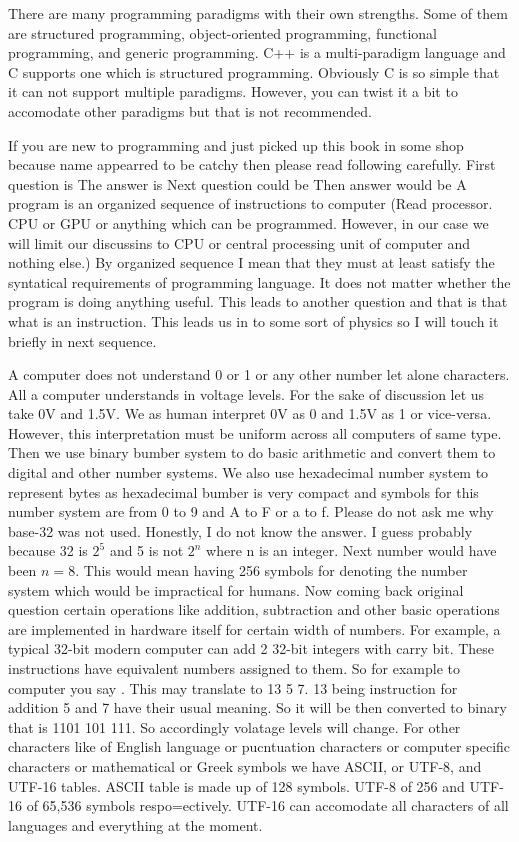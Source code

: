 There are many programming paradigms with their own strengths. Some of them are
structured programming, object-oriented programming, functional programming,
and generic programming. C++ is a multi-paradigm language and C supports one
which is structured programming. Obviously C is so simple that it can not
support multiple paradigms. However, you can twist it a bit to accomodate other
paradigms but that is not recommended.

If you are new to programming and just picked up this book in some shop because
name appearred to be catchy then please read following carefully. First question
is  The answer is  Next question
could be  Then answer would be {A program is an
organized sequence of instructions to computer (Read processor. CPU or GPU or
anything which can be programmed. However, in our case we will limit our
discussins to CPU or central processing unit of computer and nothing else.)} By 
organized sequence I mean that they must at least satisfy the syntatical
requirements of programming  language. It does not matter whether the program is
doing anything useful. This leads to another question and that is that what is
an instruction. This leads us in to some sort of physics so I will touch it
briefly in next sequence.

A computer does not understand 0 or 1 or any other number let alone characters.
All a computer understands in voltage levels. For the sake of discussion let us
take 0V and 1.5V. We as human interpret 0V as 0 and 1.5V as 1 or vice-versa.
However, this interpretation must be uniform across all computers of same type.
Then we use binary bumber system to do basic arithmetic and convert them to
digital and other number systems. We also use hexadecimal number system to 
represent bytes as hexadecimal bumber is very compact and symbols for this
number system are from 0 to 9 and A to F or a to f. Please do not ask me why
base-32 was not used. Honestly, I do not know the answer. I guess probably
because 32 is $2^5$ and 5 is not $2^n$ where n is an integer. Next number would
have been $n=8$. This would mean having 256 symbols for denoting the number
system which would be impractical for humans. Now coming back original question
certain operations like addition, subtraction and other basic operations are
implemented in hardware itself for certain width of numbers. For example, a
typical 32-bit modern computer can add 2 32-bit integers with carry bit. These
instructions have equivalent numbers assigned to them. So for example to
computer you say . This may translate to 13 5 7. 13 being
instruction for addition 5 and 7 have their usual meaning. So it will be then
converted to binary that is 1101 101 111. So accordingly volatage levels will
change. For other characters like of English language or pucntuation characters
or computer specific characters or mathematical or Greek symbols we have ASCII,
or UTF-8, and UTF-16 tables. ASCII table is made up of 128 symbols.
UTF-8 of 256 and UTF-16 of 65,536 symbols respo=ectively. UTF-16 can accomodate 
all characters of all languages and everything at the moment. 


